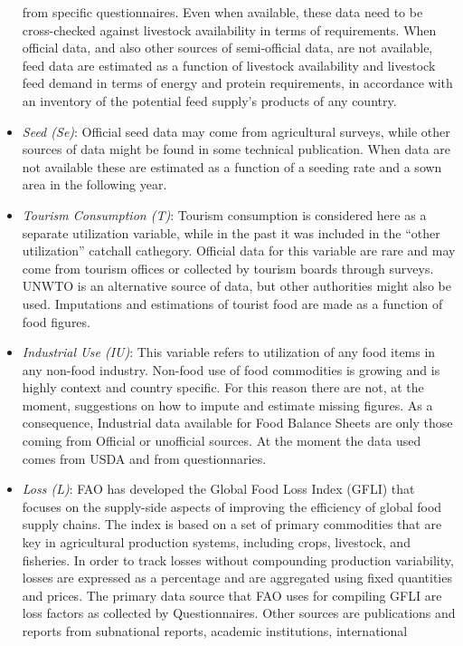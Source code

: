 \documentclass[]{article}
\begin{document}
\begin{itemize}
  from specific questionnaires. Even when available, these data need to
  be cross-checked against livestock availability in terms of
  requirements. When official data, and also other sources of
  semi-official data, are not available, feed data are estimated as a
  function of livestock availability and livestock feed demand in terms
  of energy and protein requirements, in accordance with an inventory of
  the potential feed supply's products of any country.
\item
  \emph{Seed (Se)}: Official seed data may come from agricultural
  surveys, while other sources of data might be found in some technical
  publication. When data are not available these are estimated as a
  function of a seeding rate and a sown area in the following year.
\item
  \emph{Tourism Consumption (T)}: Tourism consumption is considered here
  as a separate utilization variable, while in the past it was included
  in the ``other utilization'' catchall cathegory. Official data for
  this variable are rare and may come from tourism offices or collected
  by tourism boards through surveys. UNWTO is an alternative source of
  data, but other authorities might also be used. Imputations and
  estimations of tourist food are made as a function of food figures.
\item
  \emph{Industrial Use (IU)}: This variable refers to utilization of any
  food items in any non-food industry. Non-food use of food commodities
  is growing and is highly context and country specific. For this reason
  there are not, at the moment, suggestions on how to impute and
  estimate missing figures. As a consequence, Industrial data available
  for Food Balance Sheets are only those coming from Official or
  unofficial sources. At the moment the data used comes from USDA and
  from questionnaries.
\item
  \emph{Loss (L)}: FAO has developed the Global Food Loss Index (GFLI)
  that focuses on the supply-side aspects of improving the efficiency of
  global food supply chains. The index is based on a set of primary
  commodities that are key in agricultural production systems, including
  crops, livestock, and fisheries. In order to track losses without
  compounding production variability, losses are expressed as a
  percentage and are aggregated using fixed quantities and prices. The
  primary data source that FAO uses for compiling GFLI are loss factors
  as collected by Questionnaires. Other sources are publications and
  reports from subnational reports, academic institutions, international

\end{itemize}
\end{document}
